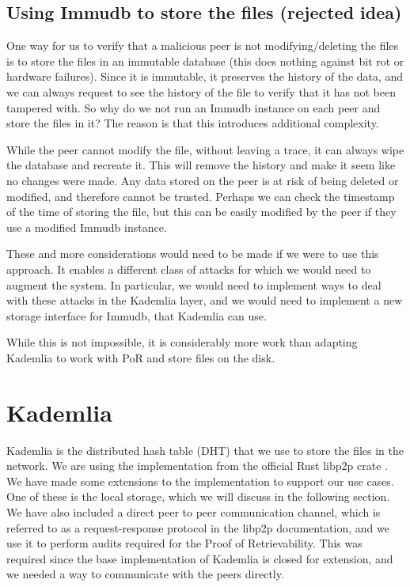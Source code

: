 \subsection{Using Immudb to store the files (rejected idea)}

One way for us to verify that a malicious peer is not modifying/deleting the files is
to store the files in an immutable database (this does nothing against bit rot or hardware failures).
Since it is immutable, it preserves the history of the data, and we can always request to see the history
of the file to verify that it has not been tampered with.
So why do we not run an Immudb instance on each peer and store the files in it?
The reason is that this introduces additional complexity.

While the peer cannot modify the file, without leaving a trace,
it can always wipe the database and recreate it.
This will remove the history and make it seem like no changes were made.
Any data stored on the peer is at risk of being deleted or modified,
and therefore cannot be trusted.
Perhaps we can check the timestamp of the time of storing the file,
but this can be easily modified by the peer if they use a modified Immudb instance.

These and more considerations would need to be made if we were to use this approach.
It enables a different class of attacks for which we would need to augment the system.
In particular, we would need to implement ways to deal with these attacks in the Kademlia layer,
and we would need to implement a new storage interface for Immudb, that Kademlia can use.

While this is not impossible, it is considerably more work than adapting Kademlia to
work with PoR and store files on the disk.

\section{Kademlia}

Kademlia is the distributed hash table (DHT) that we use to store the files in the network.
We are using the implementation from the official Rust libp2p crate \cite{rustlibp2p}.
We have made some extensions to the implementation to support our use cases.
One of these is the local storage, which we will discuss in the following section.
We have also included a direct peer to peer communication channel,
which is referred to as a request-response protocol in the libp2p documentation,
and we use it to perform audits required for the Proof of Retrievability.
This was required since the base implementation of Kademlia is closed for extension,
and we needed a way to communicate with the peers directly.

